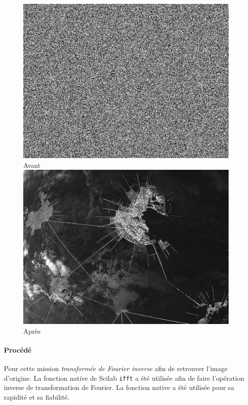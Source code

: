 	\begin{figure}[h]
	\centering
		\begin{multicols}{2}
		\includegraphics[scale=0.525]{images/X1.png}
		Avant
		\includegraphics[scale=0.525]{images/X1AFTER.png}
		Après
		\end{multicols}
	\end{figure}
	\vspace{-0.9cm}

		\paragraph{Procédé}	
			Pour cette mission \emph{transformée de Fourier inverse} afin de retrouver l'image d'origine. La fonction native de Scilab \texttt{ifft} a été utilisée afin de faire l'opération inverse de transformation de Fourier. La fonction native a été utilisée pour sa rapidité et sa fiabilité.